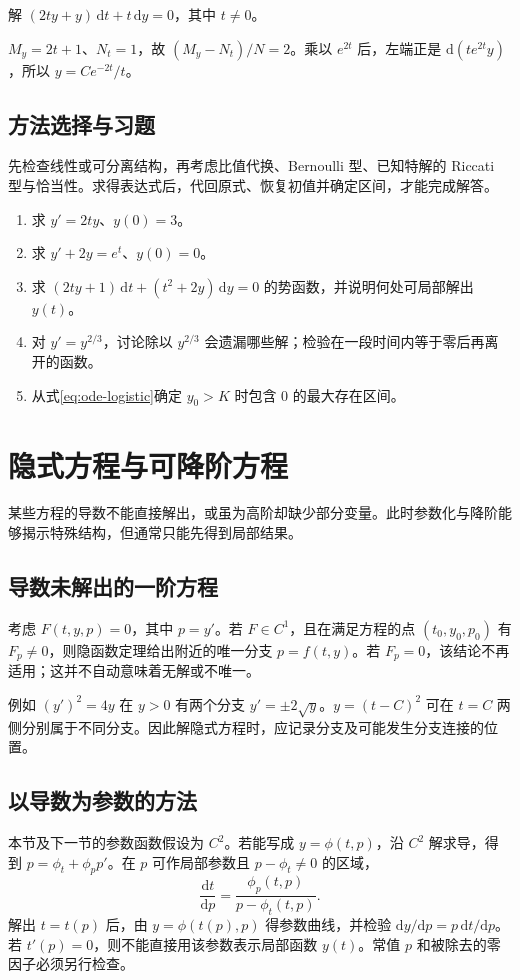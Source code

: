 \documentclass[UTF8,12pt,a4paper,fontset=fandol]{ctexbook}
\begin{document}
\begin{example}
解 $(2ty+y)\,\mathrm dt+t\,\mathrm dy=0$，其中 $t\ne0$。
\end{example}
\begin{solve}
$M_y=2t+1$、$N_t=1$，故 $(M_y-N_t)/N=2$。乘以 $e^{2t}$ 后，左端正是 $\mathrm d(te^{2t}y)$，所以 $y=Ce^{-2t}/t$。
\end{solve}

\section{方法选择与习题}
先检查线性或可分离结构，再考虑比值代换、Bernoulli 型、已知特解的 Riccati 型与恰当性。求得表达式后，代回原式、恢复初值并确定区间，才能完成解答。
\begin{enumerate}
 \item\label{ex:ode-separate} 求 $y'=2ty$、$y(0)=3$。
 \item\label{ex:ode-linear} 求 $y'+2y=e^t$、$y(0)=0$。
 \item\label{ex:ode-exact} 求 $(2ty+1)\,\mathrm dt+(t^2+2y)\,\mathrm dy=0$ 的势函数，并说明何处可局部解出 $y(t)$。
 \item 对 $y'=y^{2/3}$，讨论除以 $y^{2/3}$ 会遗漏哪些解；检验在一段时间内等于零后再离开的函数。
 \item 从式\eqref{eq:ode-logistic}确定 $y_0>K$ 时包含 $0$ 的最大存在区间。
\end{enumerate}

\chapter{隐式方程与可降阶方程}
\label{chap:ode-reduction}

某些方程的导数不能直接解出，或虽为高阶却缺少部分变量。此时参数化与降阶能够揭示特殊结构，但通常只能先得到局部结果。

\section{导数未解出的一阶方程}
考虑 $F(t,y,p)=0$，其中 $p=y'$。若 $F\in C^1$，且在满足方程的点 $(t_0,y_0,p_0)$ 有 $F_p\ne0$，则隐函数定理给出附近的唯一分支 $p=f(t,y)$。若 $F_p=0$，该结论不再适用；这并不自动意味着无解或不唯一。

例如 $(y')^2=4y$ 在 $y>0$ 有两个分支 $y'=\pm2\sqrt y$。$y=(t-C)^2$ 可在 $t=C$ 两侧分别属于不同分支。因此解隐式方程时，应记录分支及可能发生分支连接的位置。

\section{以导数为参数的方法}
本节及下一节的参数函数假设为 $C^2$。若能写成 $y=\phi(t,p)$，沿 $C^2$ 解求导，得到 $p=\phi_t+\phi_p p'$。在 $p$ 可作局部参数且 $p-\phi_t\ne0$ 的区域，
\[
 \frac{\mathrm dt}{\mathrm dp}=\frac{\phi_p(t,p)}{p-\phi_t(t,p)}.
\]
解出 $t=t(p)$ 后，由 $y=\phi(t(p),p)$ 得参数曲线，并检验 $\mathrm dy/\mathrm dp=p\,\mathrm dt/\mathrm dp$。若 $t'(p)=0$，则不能直接用该参数表示局部函数 $y(t)$。常值 $p$ 和被除去的零因子必须另行检查。
\end{document}
